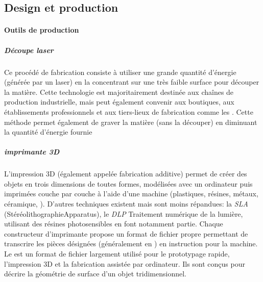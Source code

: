     \subsection{Design et production}
        \paragraph{Outils de production}\label{sec:3D_print}
            \subparagraph{Découpe laser}
                Ce procédé de fabrication consiste à utiliser une grande quantité d’énergie (générée par un laser) en la concentrant sur une très faible surface pour découper la matière. Cette technologie est majoritairement destinée aux chaînes de production industrielle, mais peut également convenir aux boutiques, aux établissements professionnels et aux tiers-lieux de fabrication comme les . Cette méthode permet également de graver la matière (sans la découper) en diminuant la quantité d'énergie fournie
            \subparagraph{imprimante 3D}
                L’impression 3D (également appelée fabrication additive) permet de créer des objets en trois dimensions de toutes formes, modélisées avec un ordinateur puis imprimées couche par couche à l’aide d’une machine (plastiques, résines, métaux, céramique, \etc).
                D'autres techniques existent mais sont moins répandues: la \textit{SLA} (StéréolithographieApparatus), le \textit{DLP} Traitement numérique de la lumière, utilisant des résines photosensibles en font notamment partie.
                Chaque constructeur d'imprimante propose un format de fichier propre permettant de transcrire les pièces désignées (généralement en ) en instruction pour la machine. 
                Le  est un format de fichier largement utilisé pour le prototypage rapide, l'impression 3D et la fabrication assistée par ordinateur. Ils sont conçus pour décrire la géométrie de surface d'un objet tridimensionnel.
